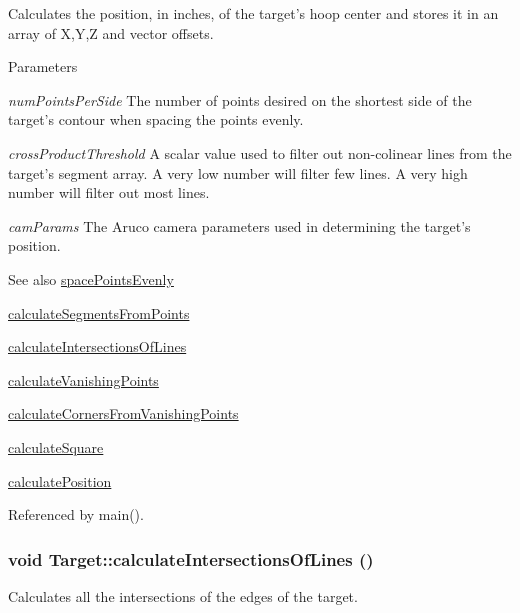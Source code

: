 Calculates the position, in inches, of the target's hoop center and stores it in an array of X,Y,Z and vector offsets. 
\begin{DoxyParams}{Parameters}
\item[{\em numPointsPerSide}]The number of points desired on the shortest side of the target's contour when spacing the points evenly. \item[{\em crossProductThreshold}]A scalar value used to filter out non-\/colinear lines from the target's segment array. A very low number will filter few lines. A very high number will filter out most lines. \item[{\em camParams}]The Aruco camera parameters used in determining the target's position. \end{DoxyParams}
\begin{DoxySeeAlso}{See also}
\hyperlink{classTarget_a11d364c4df4e83d475c33b4a4915a792}{spacePointsEvenly} 

\hyperlink{classTarget_a097b47c75568969a979ef67247b6f919}{calculateSegmentsFromPoints} 

\hyperlink{classTarget_a8dad4ab3c5aefb6a07aa41a4b450fdea}{calculateIntersectionsOfLines} 

\hyperlink{classTarget_a02a9ec40b224fe31bf6635bfc78820b3}{calculateVanishingPoints} 

\hyperlink{classTarget_a8e4a735a5ce6ebaa32ac83712ec4e75f}{calculateCornersFromVanishingPoints} 

\hyperlink{classTarget_aad1871823a8599d3d095c988451ad3ea}{calculateSquare} 

\hyperlink{classTarget_aaeb297087804d9d7952b0588d76ac213}{calculatePosition} 
\end{DoxySeeAlso}


Referenced by main().

\hypertarget{classTarget_a8dad4ab3c5aefb6a07aa41a4b450fdea}{
\subsubsection[{calculateIntersectionsOfLines}]{\setlength{\rightskip}{0pt plus 5cm}void Target::calculateIntersectionsOfLines ()}}
\label{classTarget_a8dad4ab3c5aefb6a07aa41a4b450fdea}


Calculates all the intersections of the edges of the target. 

